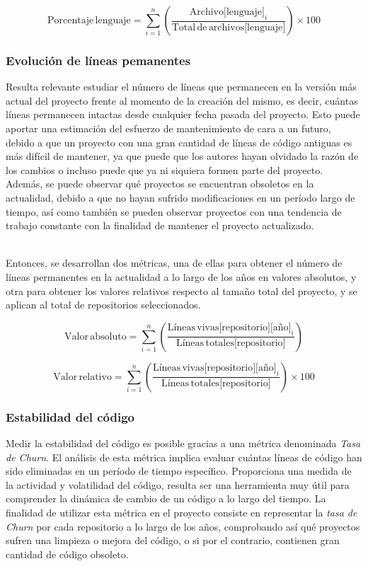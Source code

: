 \documentclass[a4paper, 12pt]{book}
\begin{document}
\[\text{Porcentaje} \, \text{lenguaje} = \sum_{i=1}^{n} \left( \frac{\text{Archivo[lenguaje]}_i}{\text{Total} \, \text{de} \, \text{archivos[lenguaje]}} \right) \times 100\]

\subsubsection{Evolución de líneas pemanentes}
\label{subsubsec:lineas-vivas}

Resulta relevante estudiar el número de líneas que permanecen en la versión más actual del proyecto frente al momento de la creación del mismo, es decir, cuántas líneas permanecen intactas desde cualquier fecha pasada del proyecto. 
Esto puede aportar una estimación del esfuerzo de mantenimiento de cara a un futuro, debido a que un proyecto con una gran cantidad de líneas de código antiguas es más difícil de mantener, ya que puede que los autores 
hayan olvidado la razón de los cambios o incluso puede que ya ni siquiera formen parte del proyecto. Además, se puede observar qué proyectos se encuentran obsoletos en la actualidad, debido a que no hayan sufrido
modificaciones en un período largo de tiempo, así como también se pueden observar proyectos con una tendencia de trabajo constante con la finalidad de mantener el proyecto actualizado.

\\Entonces, se desarrollan dos métricas, una de ellas para obtener el número de líneas permanentes en la actualidad a lo largo de los años en valores absolutos, y otra para obtener los valores relativos respecto al tamaño total
del proyecto, y se aplican al total de repositorios seleccionados.

\[\text{Valor} \, \text{absoluto} = \sum_{i=1}^{n} \left( \frac{\text{Líneas} \, \text{vivas[repositorio][año]}_i}{\text{Líneas} \, \text{totales[repositorio]}} \right)\]

\[\text{Valor} \, \text{relativo} = \sum_{i=1}^{n} \left( \frac{\text{Líneas} \, \text{vivas[repositorio][año]}_i}{\text{Líneas} \, \text{totales[repositorio]}} \right) \times 100 \]


\subsubsection{Estabilidad del código}
\label{subsubsec:estabilidad-codigo}

Medir la estabilidad del código es posible gracias a una métrica denominada \textit{Tasa de Churn}. El análisis de esta métrica implica evaluar cuántas líneas de código han sido eliminadas en un período de tiempo específico.
Proporciona una medida de la actividad y volatilidad del código, resulta ser una herramienta muy útil para comprender la dinámica de cambio de un código a lo largo del tiempo. La finalidad de utilizar esta métrica en el proyecto
consiste en representar la \textit{tasa de Churn} por cada repositorio a lo largo de los años, comprobando así qué proyectos sufren una limpieza o mejora del código, o si por el contrario, contienen gran cantidad de código obsoleto.
\end{document}
